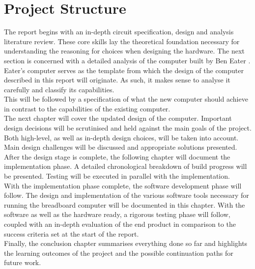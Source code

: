 \documentclass[11pt]{informatics-report}
\begin{document}
\section{Project Structure}
The report begins with an in-depth circuit specification, design and analysis literature review. These core skills lay the theoretical foundation necessary for understanding the reasoning for choices when designing the hardware.
The next section is concerned with a detailed analysis of the computer built by Ben Eater \cite{eater2019breadboard}. Eater's computer serves as the template from which the design of the computer described in this report will originate. As such, it makes sense to analyse it carefully and classify its capabilities. \\
This will be followed by a specification of what the new computer should achieve in contrast to the capabilities of the existing computer. \\
The next chapter will cover the updated design of the computer. Important design decisions will be scrutinised and held against the main goals of the project. Both high-level, as well as in-depth design choices, will be taken into account. Main design challenges will be discussed and appropriate solutions presented. \\
After the design stage is complete, the following chapter will document the implementation phase. A detailed chronological breakdown of build progress will be presented. Testing will be executed in parallel with the implementation. \\
With the implementation phase complete, the software development phase will follow. The design and implementation of the various software tools necessary for running the breadboard computer will be documented in this chapter.
With the software as well as the hardware ready, a rigorous testing phase will follow, coupled with an in-depth evaluation of the end product in comparison to the success criteria set at the start of the report. \\
Finally, the conclusion chapter summarises everything done so far and highlights the learning outcomes of the project and the possible continuation paths for future work. \\


% 





% 
% 
% 




% 
% 
% 
\end{document}
